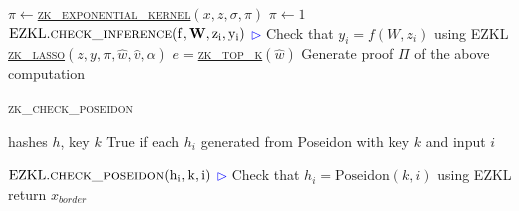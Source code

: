 \begin{algorithm}[H]
\begin{algorithmic}[1]
        \STATE $\pi \gets $\hyperref[alg:zk_exponential_kernel]{\textsc{zk\_exponential\_kernel}}$\left(x, z, \sigma, \pi \right)$
    \ELSE
        \STATE $\pi \gets 1$
    \ENDIF
        \STATE $\rm{EZKL}.\textsc{check\_inference}(f, \mathbf{W}, z_i, y_i)$  \hfill\textcolor{blue}{$\rhd$} Check that $y_i = f(W, z_i)$ using EZKL
    \ENDFOR
    \STATE \hyperref[alg:zk_lasso]{\textsc{zk\_lasso}}$(z, y, \pi, \hat{w}, \hat{v}, \alpha)$
    \STATE $e = $\hyperref[alg:zk_top_k]{\textsc{zk\_top\_k}}$(\hat{w})$
    \STATE Generate proof $\Pi$ of the above computation
\end{algorithmic}
\end{algorithm}

%
%


\begin{algorithm}[htbp]
\begin{algorithmic}[1]
   \caption{\textsc{zk\_check\_poseidon}}
   \label{alg:zk_check_poseidon}

     hashes $h$, key $k$
     True if each $h_i$ generated from Poseidon with key $k$ and input $i$

        \STATE $\rm{EZKL}.\textsc{check\_poseidon}(h_i, k, i)$ \hfill\textcolor{blue}{$\rhd$} Check that $h_i = \text{Poseidon}(k, i)$ using EZKL
    \ENDFOR
    \STATE return $x_{border}$
\end{algorithmic}
\end{algorithm}

